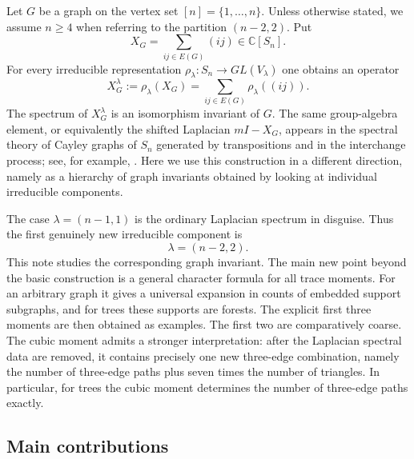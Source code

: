 \documentclass{amsart}
\theoremstyle{definition}
\newcommand{\C}{\mathbb C}
\begin{document}
Let $G$ be a graph on the vertex set $[n]=\{1,\ldots,n\}$.  Unless otherwise stated, we assume $n\geq 4$ when referring to the partition $(n-2,2)$.  Put
\[
X_G=\sum_{ij\in E(G)}(ij)\in \C[S_n].
\]
For every irreducible representation
$\rho_\lambda:S_n\to GL(V_\lambda)$ one obtains an operator
\[
X_G^\lambda:=\rho_\lambda(X_G)=\sum_{ij\in E(G)}\rho_\lambda((ij)).
\]
The spectrum of $X_G^\lambda$ is an isomorphism invariant of $G$.
The same group-algebra element, or equivalently the shifted Laplacian
$mI-X_G$, appears in the spectral theory of Cayley graphs of $S_n$ generated
by transpositions and in the interchange process; see, for example,
\cite{Cesi,CaputoLiggettRichthammer}.  Here we use this construction in a
different direction, namely as a hierarchy of graph invariants obtained by
looking at individual irreducible components.

The case $\lambda=(n-1,1)$ is the ordinary Laplacian spectrum in
disguise.  Thus the first genuinely new irreducible component is
\[
\lambda=(n-2,2).
\]
This note studies the corresponding graph invariant.
The main new point beyond the basic construction is a general character
formula for all trace moments.  For an arbitrary graph it gives a universal
expansion in counts of embedded support subgraphs, and for trees these
supports are forests.  The explicit first three moments are then obtained as
examples.  The first two are comparatively coarse.  The cubic moment admits
a stronger interpretation: after the Laplacian spectral data are removed,
it contains precisely one new three-edge combination, namely the number of
three-edge paths plus seven times the number of triangles.  In particular,
for trees the cubic moment determines the number of three-edge paths
exactly.


\subsection*{Main contributions}
\end{document}
